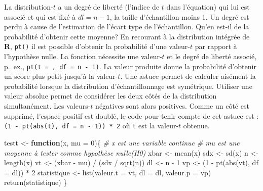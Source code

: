 \documentclass[
]{book}
\newenvironment{Shaded}{}{}
\newcommand{\AttributeTok}[1]{#1}
\newcommand{\CommentTok}[1]{\textit{#1}}
\newcommand{\ControlFlowTok}[1]{\textbf{#1}}
\newcommand{\DecValTok}[1]{#1}
\newcommand{\FunctionTok}[1]{#1}
\newcommand{\NormalTok}[1]{#1}
\newcommand{\OtherTok}[1]{#1}
\newcommand{\SpecialCharTok}[1]{#1}
\begin{document}
La distribution-\(t\) a un degré de liberté (l'indice de \(t\) dans l'équation) qui lui est associé et qui est fixé à \(dl = n - 1\), la taille d'échantillon moins 1. Un degré est perdu à cause de l'estimation de l'écart type de l'échantillon. Qu'en est-il de la probabilité d'obtenir cette moyenne? En recourant à la distribution intégrée de \textbf{R}, \texttt{pt()} il est possible d'obtenir la probabilité d'une valeur-\(t\) par rapport à l'hypothèse nulle. La fonction nécessite une valeur-\(t\) et le degré de liberté associé, p.~ex., \texttt{pt(t\ =\ ,\ df\ =\ n\ -\ 1)}. La valeur produite donne la probabilité d'obtenir un score plus petit jusqu'à la valeur-\(t\). Une astuce permet de calculer aisément la probabilité lorsque la distribution d'échantillonnage est symétrique. Utiliser une valeur absolue permet de considérer les deux côtés de la distribution simultanément. Les valeurs-\(t\) négatives sont alors positives. Comme un côté est supprimé, l'espace positif est doublé, le code pour tenir compte de cet astuce est : \texttt{(1\ -\ pt(abs(t),\ df\ =\ n\ -\ 1))\ *\ 2} où \texttt{t} est la valeur-\(t\) obtenue.

\begin{Shaded}
\begin{Highlighting}[]
\NormalTok{testt }\OtherTok{\textless{}{-}} \ControlFlowTok{function}\NormalTok{(x, }\AttributeTok{mu =} \DecValTok{0}\NormalTok{)\{}
  \CommentTok{\# x est une variable continue}
  \CommentTok{\# mu est une moyenne à tester comme hypothèse nulle(H0)}
\NormalTok{  xbar }\OtherTok{\textless{}{-}} \FunctionTok{mean}\NormalTok{(x)}
\NormalTok{  sdx }\OtherTok{\textless{}{-}} \FunctionTok{sd}\NormalTok{(x)}
\NormalTok{  n }\OtherTok{\textless{}{-}} \FunctionTok{length}\NormalTok{(x)}
\NormalTok{  vt }\OtherTok{\textless{}{-}}\NormalTok{ (xbar }\SpecialCharTok{{-}}\NormalTok{ mu) }\SpecialCharTok{/}\NormalTok{ (sdx }\SpecialCharTok{/} \FunctionTok{sqrt}\NormalTok{(n))}
\NormalTok{  dl }\OtherTok{\textless{}{-}}\NormalTok{ n }\SpecialCharTok{{-}} \DecValTok{1}
\NormalTok{  vp }\OtherTok{\textless{}{-}}\NormalTok{ (}\DecValTok{1} \SpecialCharTok{{-}} \FunctionTok{pt}\NormalTok{(}\FunctionTok{abs}\NormalTok{(vt), }\AttributeTok{df =}\NormalTok{ dl)) }\SpecialCharTok{*} \DecValTok{2} 
\NormalTok{  statistique }\OtherTok{\textless{}{-}} \FunctionTok{list}\NormalTok{(}\AttributeTok{valeur.t =}\NormalTok{ vt, }
                      \AttributeTok{dl =}\NormalTok{ dl, }
                      \AttributeTok{valeur.p =}\NormalTok{ vp)}
  \FunctionTok{return}\NormalTok{(statistique)}
\NormalTok{\}}
\end{Highlighting}
\end{Shaded}
\end{document}
